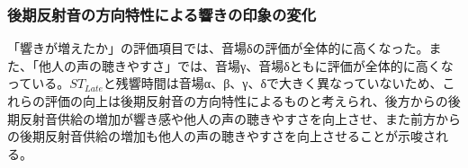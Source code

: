 \documentclass[11pt,a4j]{jreport}
\begin{document}
\newpage

\subsubsection*{後期反射音の方向特性による響きの印象の変化}
「響きが増えたか」の評価項目では、音場δの評価が全体的に高くなった。また、「他人の声の聴きやすさ」では、音場γ、音場δともに評価が全体的に高くなっている。$ST_{Late}$と残響時間は音場α、β、γ、δで大きく異なっていないため、これらの評価の向上は後期反射音の方向特性によるものと考えられ、後方からの後期反射音供給の増加が響き感や他人の声の聴きやすさを向上させ、また前方からの後期反射音供給の増加も他人の声の聴きやすさを向上させることが示唆される。

\end{document}
